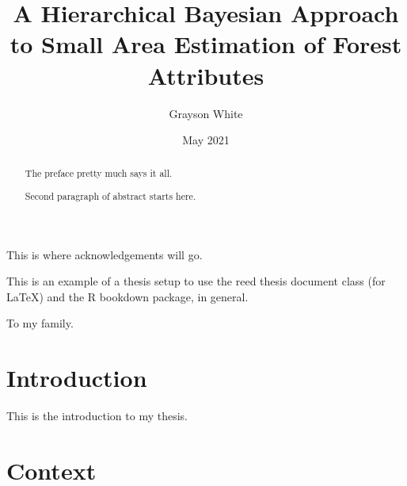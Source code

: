 \documentclass[12pt,twoside]{reedthesis}
\title{A Hierarchical Bayesian Approach to Small Area Estimation of Forest Attributes}
\author{Grayson White}
\date{May 2021}
\begin{document}
  \maketitle

\frontmatter %
\pagestyle{empty} %
  \begin{acknowledgements}
    This is where acknowledgements will go.
  \end{acknowledgements}
  \begin{preface}
    This is an example of a thesis setup to use the reed thesis document class
    (for LaTeX) and the R bookdown package, in general.
  \end{preface}
  \hypersetup{linkcolor=black}
  \setcounter{secnumdepth}{2}
  \setcounter{tocdepth}{2}
  \tableofcontents

  \listoftables

  \listoffigures
  \begin{abstract}
    The preface pretty much says it all.

    \par

    Second paragraph of abstract starts here.
  \end{abstract}
  \begin{dedication}
    To my family.
  \end{dedication}
\mainmatter %
\pagestyle{fancyplain} %

\hypertarget{introduction}{%
\chapter*{Introduction}\label{introduction}}

This is the introduction to my thesis.

\hypertarget{context}{%
\chapter{Context}\label{context}}
\end{document}
